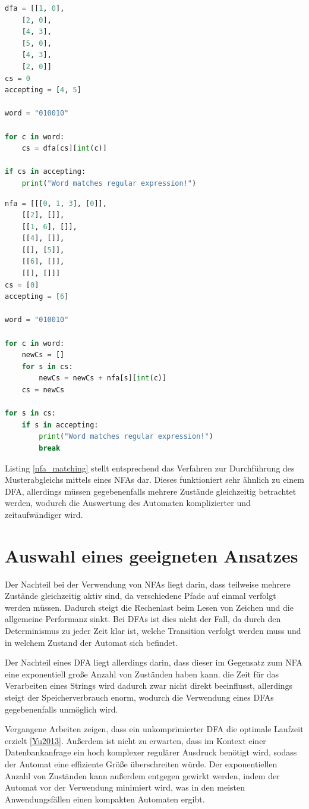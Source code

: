 \begin{lstlisting}[language=Python,
caption=Durchführung des Musterabgleichs mithilfe eines DFA,
label=dfa_matching]
dfa = [[1, 0],
	[2, 0],
	[4, 3],
	[5, 0],
	[4, 3],
	[2, 0]]
cs = 0
accepting = [4, 5]

word = "010010"

for c in word:
	cs = dfa[cs][int(c)]

if cs in accepting:
	print("Word matches regular expression!")
\end{lstlisting}

\begin{lstlisting}[language=Python,
caption=Durchführung des Musterabgleichs mithilfe eines NFA,
label=nfa_matching]
nfa = [[[0, 1, 3], [0]],
	[[2], []],
	[[1, 6], []],
	[[4], []],
	[[], [5]],
	[[6], []],
	[[], []]]
cs = [0]
accepting = [6]

word = "010010"

for c in word:
	newCs = []
	for s in cs:
		newCs = newCs + nfa[s][int(c)]
	cs = newCs

for s in cs:
	if s in accepting:
		print("Word matches regular expression!")
		break
\end{lstlisting}

Listing \ref{nfa_matching} stellt entsprechend das Verfahren zur Durchführung des Musterabgleichs mittels eines NFAs dar.
Dieses funktioniert sehr ähnlich zu einem DFA, allerdings müssen gegebenenfalls mehrere Zustände gleichzeitig betrachtet werden, wodurch die Auswertung des Automaten komplizierter und zeitaufwändiger wird.

\section{Auswahl eines geeigneten Ansatzes}

Der Nachteil bei der Verwendung von NFAs liegt darin, dass teilweise mehrere Zustände gleichzeitig aktiv sind, da verschiedene Pfade auf einmal verfolgt werden müssen.
Dadurch steigt die Rechenlast beim Lesen von Zeichen und die allgemeine Performanz sinkt.
Bei DFAs ist dies nicht der Fall, da durch den Determinismus zu jeder Zeit klar ist, welche Transition verfolgt werden muss und in welchem Zustand der Automat sich befindet.

Der Nachteil eines DFA liegt allerdings darin, dass dieser im Gegensatz zum NFA eine exponentiell große Anzahl von Zuständen haben kann.
die Zeit für das Verarbeiten eines Strings wird dadurch zwar nicht direkt beeinflusst, allerdings steigt der Speicherverbrauch enorm, wodurch die Verwendung eines DFAs gegebenenfalls unmöglich wird.

Vergangene Arbeiten zeigen, dass ein unkomprimierter DFA die optimale Laufzeit erzielt \ref{Yu2013}.
Außerdem ist nicht zu erwarten, dass im Kontext einer Datenbankanfrage ein hoch komplexer regulärer Ausdruck benötigt wird, sodass der Automat eine effiziente Größe überschreiten würde.
Der exponentiellen Anzahl von Zuständen kann außerdem entgegen gewirkt werden, indem der Automat vor der Verwendung minimiert wird, was in den meisten Anwendungsfällen einen kompakten Automaten ergibt.
